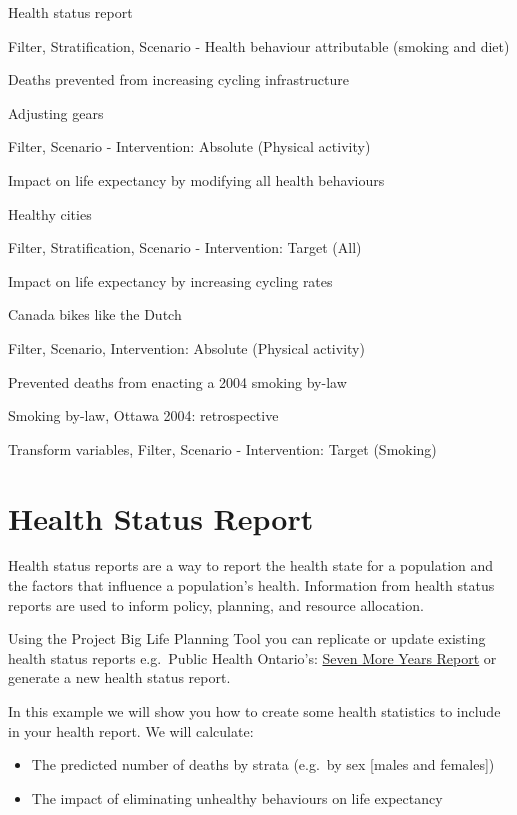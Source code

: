 \documentclass[]{book}
\providecommand{\tightlist}{%
  \setlength{\itemsep}{0pt}\setlength{\parskip}{0pt}}
\begin{document}
Health status report

Filter,
Stratification,
Scenario - Health behaviour attributable (smoking and diet)

Deaths prevented from increasing cycling infrastructure

Adjusting gears

Filter,
Scenario - Intervention: Absolute (Physical activity)

Impact on life expectancy by modifying all health behaviours

Healthy cities

Filter,
Stratification,
Scenario - Intervention: Target (All)

Impact on life expectancy by increasing cycling rates

Canada bikes like the Dutch

Filter,
Scenario,
Intervention: Absolute (Physical activity)

Prevented deaths from enacting a 2004 smoking by-law

Smoking by-law, Ottawa 2004: retrospective

Transform variables,
Filter,
Scenario - Intervention: Target (Smoking)

\hypertarget{health-status-report}{%
\section{Health Status Report}\label{health-status-report}}

Health status reports are a way to report the health state for a population and the factors that influence a population's health. Information from health status reports are used to inform policy, planning, and resource allocation.

Using the Project Big Life Planning Tool you can replicate or update existing health status reports e.g.~Public Health Ontario's: \href{https://www.ices.on.ca/Publications/Atlases-and-Reports/2012/Seven-More-Years}{Seven More Years Report} or generate a new health status report.

In this example we will show you how to create some health statistics to include in your health report. We will calculate:

\begin{itemize}
\tightlist
\item
  The predicted number of deaths by strata (e.g.~by sex {[}males and females{]})
\item
  The impact of eliminating unhealthy behaviours on life expectancy
\end{itemize}
\end{document}
